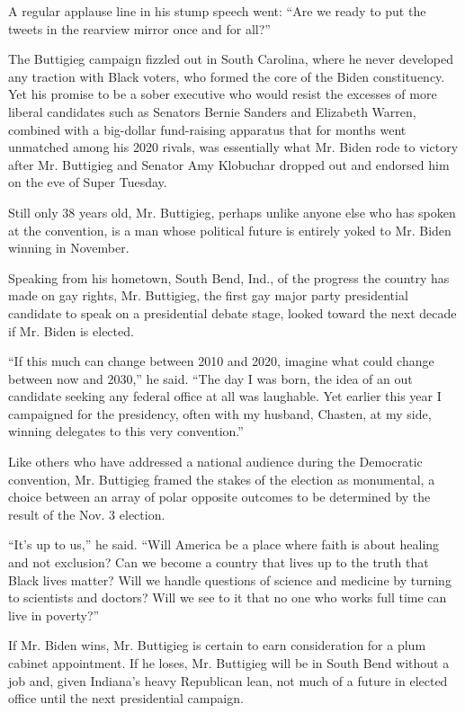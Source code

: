 A regular applause line in his stump speech went: ``Are we ready to put
the tweets in the rearview mirror once and for all?''

The Buttigieg campaign fizzled out in South Carolina, where he never
developed any traction with Black voters, who formed the core of the
Biden constituency. Yet his promise to be a sober executive who would
resist the excesses of more liberal candidates such as Senators Bernie
Sanders and Elizabeth Warren, combined with a big-dollar fund-raising
apparatus that for months went unmatched among his 2020 rivals, was
essentially what Mr. Biden rode to victory after Mr. Buttigieg and
Senator Amy Klobuchar dropped out and endorsed him on the eve of Super
Tuesday.

Still only 38 years old, Mr. Buttigieg, perhaps unlike anyone else who
has spoken at the convention, is a man whose political future is
entirely yoked to Mr. Biden winning in November.

Speaking from his hometown, South Bend, Ind., of the progress the
country has made on gay rights, Mr. Buttigieg, the first gay major party
presidential candidate to speak on a presidential debate stage, looked
toward the next decade if Mr. Biden is elected.

``If this much can change between 2010 and 2020, imagine what could
change between now and 2030,'' he said. ``The day I was born, the idea
of an out candidate seeking any federal office at all was laughable. Yet
earlier this year I campaigned for the presidency, often with my
husband, Chasten, at my side, winning delegates to this very
convention.''

Like others who have addressed a national audience during the Democratic
convention, Mr. Buttigieg framed the stakes of the election as
monumental, a choice between an array of polar opposite outcomes to be
determined by the result of the Nov. 3 election.

``It's up to us,'' he said. ``Will America be a place where faith is
about healing and not exclusion? Can we become a country that lives up
to the truth that Black lives matter? Will we handle questions of
science and medicine by turning to scientists and doctors? Will we see
to it that no one who works full time can live in poverty?''

If Mr. Biden wins, Mr. Buttigieg is certain to earn consideration for a
plum cabinet appointment. If he loses, Mr. Buttigieg will be in South
Bend without a job and, given Indiana's heavy Republican lean, not much
of a future in elected office until the next presidential campaign.

